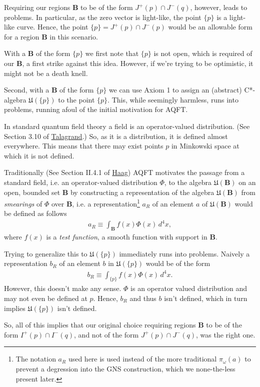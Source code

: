 Requiring our regions $\mathbf{B}$ to be of the form $J^+(p) \cap J^-(q)$, however, leads to problems. In particular, as the zero vector is light-like, the point $\{p\}$ is a light-like curve. Hence, the point $\{p\}=J^+(p) \cap J^-(p)$ would be an allowable form for a region $\mathbf{B}$ in this scenario.

With a $\mathbf{B}$ of the form $\{p\}$ we first note that $\{p\}$ is not open, which is required of our $\mathbf{B}$, a first strike against this idea. However, if we're trying to be optimistic, it might not be a death knell.

Second, with a $\mathbf{B}$ of the form $\{p\}$ we can use Axiom 1 to assign an (abstract) C*-algebra $\mathfrak{U}(\{p\})$ to the point $\{p\}$. This, while seemingly harmless, runs into problems, running afoul of the initial motivation for AQFT.

In standard quantum field theory a field is an operator-valued distribution. (See Section 3.10 of \href{https://doi.org/10.1017/9781108225144}{Talagrand}.) So, as it is a distribution, it is defined almost everywhere. This means that there may exist points $p$ in Minkowski space at which it is not defined.

Traditionally (See Section II.4.1 of \href{https://doi.org/10.1007/978-3-642-61458-3}{Haag}) AQFT motivates the passage from a standard field, i.e. an operator-valued distribution $\Phi$, to the algebra $\mathfrak{U}(\mathbf{B})$ on an open, bounded set $\mathbf{B}$ by constructing a representation of the algebra $\mathfrak{U}(\mathbf{B})$ from \textit{smearings} of $\Phi$ over $\mathbf{B}$, i.e. a representation\footnote{The notation $a_R$ used here is used instead of the more traditional $\pi_\omega(a)$ to prevent a degression into the GNS construction, which we none-the-less present later.} $a_R$ of an element $a$ of $\mathfrak{U}(\mathbf{B})$ would be defined as follows
\begin{align}
    a_R \equiv \int_{\mathbf{B}} f(x) \Phi(x) \, d^4x,
\end{align}
where $f(x)$ is a \textit{test function}, a smooth function with support in $\mathbf{B}$.

Trying to generalize this to $\mathfrak{U}(\{p\})$ immediately runs into problems. Naively a representation $b_R$ of an element $b$ in $\mathfrak{U}(\{p\})$ would be of the form
\begin{align}
    b_R \equiv \int_{\{p\}} f(x) \Phi(x) \, d^4x.
\end{align}
However, this doesn't make any sense. $\Phi$ is an operator valued distribution and may not even be defined at $p$. Hence, $b_R$ and thus $b$ isn't defined, which in turn implies $\mathfrak{U}(\{p\})$ isn't defined.

So, all of this implies that our original choice requiring regions $\mathbf{B}$ to be of the form $I^+(p) \cap I^-(q)$, and not of the form $J^+(p) \cap J^-(q)$, was the right one.
